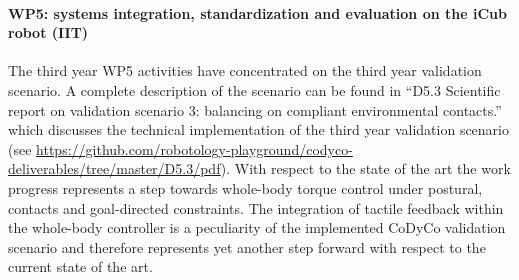 
\paragraph*{WP5: systems integration, standardization and evaluation on the iCub robot (IIT)}

The third year WP5 activities have concentrated on the third year validation scenario. A complete
description of the scenario can be found in ``D5.3 Scientific report on validation scenario 3:
balancing on compliant environmental contacts.'' \cite{deliverable53} which discusses the technical
implementation of the third year validation scenario (see
\url{https://github.com/robotology-playground/codyco-deliverables/tree/master/D5.3/pdf}). With
respect to the state of the art the work progress represents a step towards whole-body torque
control under postural, contacts and goal-directed constraints. The integration of tactile
feedback within the whole-body controller is a peculiarity of the implemented CoDyCo validation
scenario and therefore represents yet another step forward with respect to the current state of
the art.
